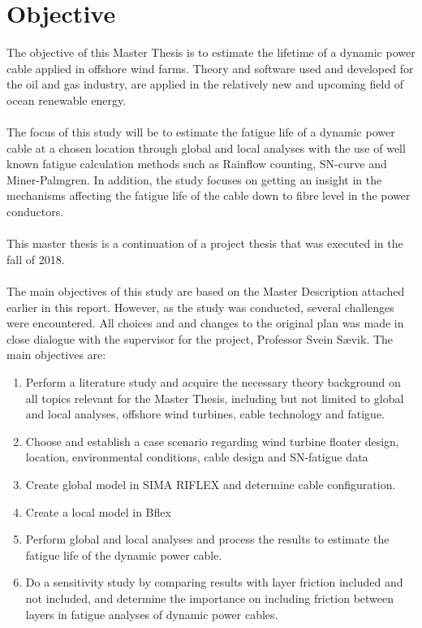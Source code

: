 \section{Objective}
The objective of this Master Thesis is to estimate the lifetime of a dynamic power cable applied in offshore wind farms. Theory and software used and developed for the oil and gas industry, are applied in the relatively new and upcoming field of ocean renewable energy.\\\\
The focus of this study will be to estimate the fatigue life of a dynamic power cable at a chosen location through global and local analyses with the use of well known fatigue calculation methods such as Rainflow counting, SN-curve and Miner-Palmgren.  In addition, the study focuses on getting an insight in the mechanisms affecting the fatigue life of the cable down to fibre level in the power conductors. \\\\
This master thesis is a continuation of a project thesis that was executed in the fall of 2018.\\\\
The main objectives of this study are based on the Master Description attached earlier in this report. However, as the study was conducted, several challenges were encountered. All choices and and changes to the original plan was made in close dialogue with the supervisor for the project, Professor Svein Sævik. The main objectives are:
\begin{enumerate}
    \item Perform a literature study and acquire the necessary theory background on all topics relevant for the Master Thesis, including but not limited to global and local analyses, offshore wind turbines, cable technology and fatigue.
    \item Choose and establish a case scenario regarding wind turbine floater design, location, environmental conditions, cable design and SN-fatigue data
    \item Create global model in SIMA RIFLEX and determine cable configuration. 
    \item Create a local model in Bflex
    \item Perform global and local analyses and process the results to estimate the fatigue life of the dynamic power cable.
    \item Do a sensitivity study by comparing results with layer friction included and not included, and determine the importance on including friction between layers in fatigue analyses of dynamic power cables.  
\end{enumerate} 

